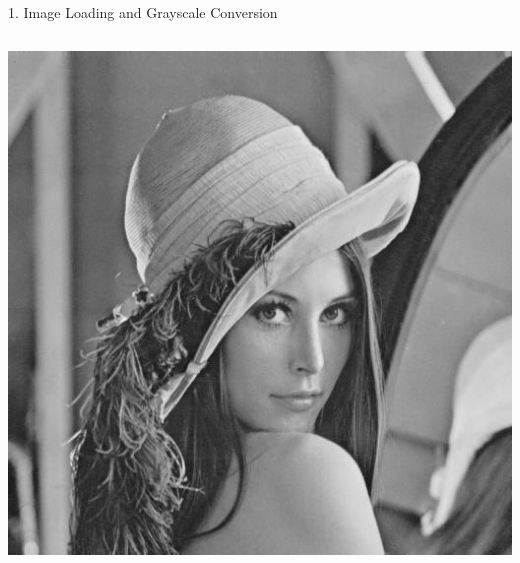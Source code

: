 \documentclass{beamer}
\begin{document}
\begin{frame}{1. Image Loading and Grayscale Conversion}
\begin{columns}
        \centering
        \includegraphics[width=\linewidth]{fig/gray.jpg}
    \end{columns}
\end{frame}
\end{document}
